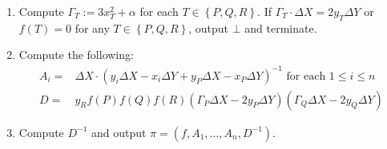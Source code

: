\documentclass[11pt,letterpaper]{article}
\theoremstyle{definition}
\newcommand{\6}{\mathbf}
\newcommand{\7}{\mathcal}
\newcommand{\non}{2 y_R \Delta X f(P)f(Q)f_X(R)(4 y_P y_Q  \Delta Y - y_P  \Gamma_Q \Delta X  - y_Q  \Gamma_P \Delta X )}
\newcommand{\ntw}{\Gamma_R \Delta X f(P)f(Q)f_Y(R)(4 y_P y_Q \Delta Y - y_P \Gamma_Q \Delta X  - y_Q \Gamma_P \Delta X )}
\newcommand{\nth}{2 y_P y_R \Delta X f(Q)f(R)f_X(P)(\Gamma_Q \Delta X - 2 y_Q \Delta Y)}
\newcommand{\nfo}{y_R \Gamma_P \Delta X f(Q)f(R)f_Y(P)(\Gamma_Q \Delta X  - 2  y_Q \Delta Y)}
\newcommand{\nfi}{2 y_Q y_R \Delta X  f(P)f(R)f_X(Q)(\Gamma_P \Delta X - 2 y_P \Delta Y) }
\newcommand{\nsi}{y_R \Gamma_Q \Delta X f(P)f(R)f_Y(Q)(\Gamma_P  \Delta X - 2  y_P \Delta Y) }
\newcommand{\den}{y_R f(P)f(Q)f(R)(\Gamma_P\Delta X - 2 y_P \Delta Y)(\Gamma_Q\Delta X - 2 y_Q \Delta Y)}
\begin{document}
\begin{itemize}
\begin{enumerate}
\item \label{prove6} Compute $\Gamma_T := 3x_T^2 + \alpha$ for each $T \in \left\{P, Q, R\right\}$. If $\Gamma_T \cdot
\Delta X  = 2 y_T \Delta Y$  or $f(T) = 0$ for any $T \in \left\{P, Q, R\right\}$, output $\bot$ and terminate.


\item \label{prove7} Compute the following:
\begin{align*}
A_i =& \Delta X \cdot(y_i \Delta X - x_i \Delta Y + y_P \Delta X - x_P \Delta Y)^{-1}\text{ for each }1 \leq i \leq n  \\
D =& \den
\end{align*}


\item \label{prove8} Compute $D^{-1}$ and output $\pi = (f,  A_1, \ldots, A_n, D^{-1})$. 
\end{enumerate}



\end{itemize}
\end{document}
